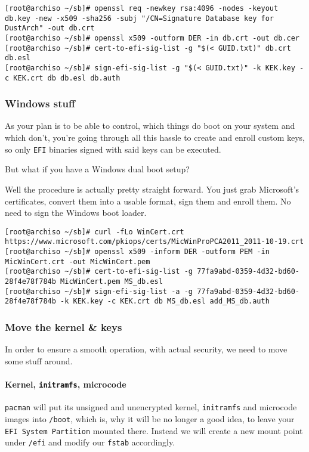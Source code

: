 \documentclass[9pt]{report}
\begin{document}
\begin{verbatim}
[root@archiso ~/sb]# openssl req -newkey rsa:4096 -nodes -keyout db.key -new -x509 -sha256 -subj "/CN=Signature Database key for DustArch" -out db.crt
[root@archiso ~/sb]# openssl x509 -outform DER -in db.crt -out db.cer
[root@archiso ~/sb]# cert-to-efi-sig-list -g "$(< GUID.txt)" db.crt db.esl
[root@archiso ~/sb]# sign-efi-sig-list -g "$(< GUID.txt)" -k KEK.key -c KEK.crt db db.esl db.auth
\end{verbatim}


\newpage

\hypertarget{x-windows-stuff}{\subsubsection{Windows stuff}}
As your plan is to be able to control, which things do boot on your system and which don’t, you’re going through all this hassle to create and enroll custom keys, so only \texttt{EFI} binaries signed with said keys can be executed.


But what if you have a Windows dual boot setup?


Well the procedure is actually pretty straight forward.
You just grab Microsoft’s certificates, convert them into a usable format, sign them and enroll them.
No need to sign the Windows boot loader.


\begin{verbatim}
[root@archiso ~/sb]# curl -fLo WinCert.crt https://www.microsoft.com/pkiops/certs/MicWinProPCA2011_2011-10-19.crt
[root@archiso ~/sb]# openssl x509 -inform DER -outform PEM -in MicWinCert.crt -out MicWinCert.pem
[root@archiso ~/sb]# cert-to-efi-sig-list -g 77fa9abd-0359-4d32-bd60-28f4e78f784b MicWinCert.pem MS_db.esl
[root@archiso ~/sb]# sign-efi-sig-list -a -g 77fa9abd-0359-4d32-bd60-28f4e78f784b -k KEK.key -c KEK.crt db MS_db.esl add_MS_db.auth
\end{verbatim}


\newpage

\hypertarget{x-move-the-kernel-and-keys}{\subsubsection{Move the kernel \& keys}}
In order to ensure a smooth operation, with actual security, we need to move some stuff around.



\newpage

\hypertarget{x-kernel-initramfs-microcode}{\paragraph{Kernel, \texttt{initramfs}, microcode}}
\texttt{pacman} will put its unsigned and unencrypted kernel, \texttt{initramfs} and microcode images into \texttt{/boot}, which is, why it will be no longer a good idea, to leave your \texttt{EFI System Partition} mounted there.
Instead we will create a new mount point under \texttt{/efi} and modify our \texttt{fstab} accordingly.
\end{document}

